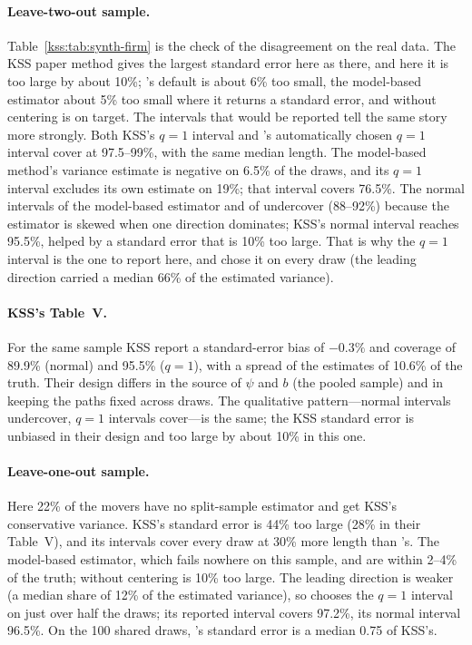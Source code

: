 \paragraph{Leave-two-out sample.} Table~\ref{kss:tab:synth-firm} is the check of the disagreement on the real
data. The KSS paper method gives the largest standard error here as there, and here it is too large by about
10\%; \fevc's default is about 6\% too small, the model-based estimator about 5\% too small where it returns a
standard error, and \fevc{} without centering is on target. The intervals that would be reported tell the same
story more strongly. Both KSS's $q=1$ interval and \fevc's automatically chosen $q=1$ interval cover at
97.5--99\%, with the same median length. The model-based method's variance estimate is negative on 6.5\%
of the draws, and its $q=1$ interval excludes its own estimate on 19\%; that interval covers 76.5\%. The normal
intervals of the model-based estimator and of \fevc{} undercover (88--92\%) because the estimator is skewed when
one direction dominates; KSS's normal interval reaches 95.5\%, helped by a standard error that is 10\% too
large.
That is why the $q=1$ interval is the one to report here, and \fevc{} chose it on every draw (the leading
direction carried a median 66\% of the estimated variance).

\paragraph{KSS's Table~V.} For the same sample KSS report a standard-error bias of $-0.3\%$ and coverage of
89.9\% (normal) and 95.5\% ($q=1$), with a spread of the estimates of 10.6\% of the truth. Their design differs
in the source of $\psi$ and $b$ (the pooled sample) and in keeping the paths fixed across draws. The
qualitative pattern---normal intervals undercover, $q=1$ intervals cover---is the same; the KSS standard error
is unbiased in their design and too large by about 10\% in this one.

\paragraph{Leave-one-out sample.} Here 22\% of the movers have no split-sample estimator and get KSS's
conservative variance. KSS's standard error is 44\% too large (28\% in their Table~V), and its intervals cover
every draw at 30\% more length than \fevc's. The model-based estimator, which fails nowhere on this sample, and
\fevc{} are within 2--4\% of the truth; \fevc{} without centering is 10\% too large. The leading direction is
weaker (a median share of 12\% of the estimated variance), so \fevc{} chooses the $q=1$ interval on just over
half the draws; its reported interval covers 97.2\%, its normal interval 96.5\%. On the 100 shared draws,
\fevc's standard error is a median 0.75 of KSS's.

